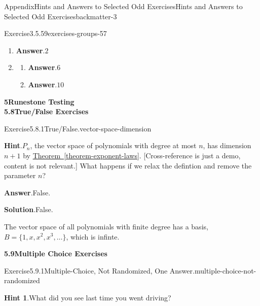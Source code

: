 \documentclass[oneside,10pt,]{book}
\newcommand{\blocktitlefont}{\relax}
\newcommand{\xreffont}{\relax}
\numberwithin{equation}{section}
\begin{document}
\begin{solutions-chapter}{Appendix}{Hints and Answers to Selected Odd Exercises}{}{Hints and Answers to Selected Odd Exercises}{}{}{backmatter-3}
\begin{divisionsolution}{Exercise}{3.5.59}{}{exercises-groups-57}
\begin{enumerate}[font=\bfseries,label=(\alph*),ref=\alph*]
\item[(a)]\noindent\textbf{\blocktitlefont Answer}.\hypertarget{exercises-groups-57-2-2-back}{}\quad{}\(2\)%
\item[(b)]\begin{enumerate}[font=\bfseries,label=(\roman*),ref=\theenumi.\roman*]%
\item[(i)]\noindent\textbf{\blocktitlefont Answer}.\hypertarget{exercises-groups-57-3-2-2-back}{}\quad{}\(6\)%
\item[(ii)]\noindent\textbf{\blocktitlefont Answer}.\hypertarget{exercises-groups-57-3-3-2-back}{}\quad{}\(10\)%
\end{enumerate}%
\end{enumerate}%
\end{divisionsolution}%
\par\medskip
\noindent\textbf{\Large{}5\space\textperiodcentered\space{}Runestone Testing\\
5.8\space\textperiodcentered\space{}True\slash{}False Exercises}
\begin{divisionsolution}{Exercise}{5.8.1}{True\slash{}False.}{vector-space-dimension}%
\par\smallskip%
\noindent\textbf{\blocktitlefont Hint}.\hypertarget{vector-space-dimension-4-back}{}\quad{}\(P_n\), the vector space of polynomials with degree at most \(n\), has dimension \(n+1\) by \hyperref[theorem-exponent-laws]{Theorem~{\xreffont\ref{theorem-exponent-laws}}}.  [Cross-reference is just a demo, content is not relevant.]  What happens if we relax the defintion and remove the parameter \(n\)?%
\par\smallskip%
\noindent\textbf{\blocktitlefont Answer}.\hypertarget{vector-space-dimension-5-back}{}\quad{}False.%
\par\smallskip%
\noindent\textbf{\blocktitlefont Solution}.\hypertarget{vector-space-dimension-6-back}{}\quad{}False.%
\par
The vector space of all polynomials with finite degree has a basis, \(B = \{1,x,x^2,x^3,\dots\}\), which is infinte.%
\end{divisionsolution}%
\par\medskip
\noindent\textbf{\Large{}5.9\space\textperiodcentered\space{}Multiple Choice Exercises}
\begin{divisionsolution}{Exercise}{5.9.1}{Multiple-Choice, Not Randomized, One Answer.}{multiple-choice-not-randomized}%
\par\smallskip%
\noindent\textbf{\blocktitlefont Hint 1}.\hypertarget{multiple-choice-not-randomized-4-back}{}\quad{}What did you see last time you went driving?%

\end{divisionsolution}
\end{solutions-chapter}
\end{document}
